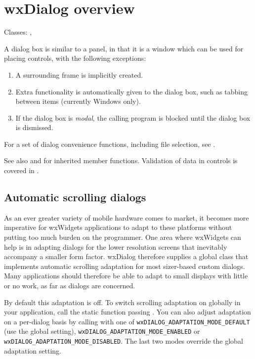 \section{wxDialog overview}\label{wxdialogoverview}

Classes: , 

A dialog box is similar to a panel, in that it is a window which can
be used for placing controls, with the following exceptions:

\begin{enumerate}
\item A surrounding frame is implicitly created.
\item Extra functionality is automatically given to the dialog box,
  such as tabbing between items (currently Windows only).
\item If the dialog box is {\it modal}, the calling program is blocked
  until the dialog box is dismissed.
\end{enumerate}

For a set of dialog convenience functions, including file selection, see
\rtfsp{}.

See also  and  for inherited
member functions. Validation of data in controls is covered in .

\subsection{Automatic scrolling dialogs}\label{autoscrollingdialogs}

As an ever greater variety of mobile hardware comes to market, it becomes more imperative for wxWidgets applications to adapt
to these platforms without putting too much burden on the programmer. One area where wxWidgets can help is in adapting
dialogs for the lower resolution screens that inevitably accompany a smaller form factor. wxDialog therefore supplies
a global  class that implements automatic scrolling adaptation for most sizer-based custom dialogs.
Many applications should therefore be able to adapt to small displays with little or no work, as far as dialogs are concerned.

By default this adaptation is off. To switch scrolling adaptation on globally in your application, call the static function\rtfsp
{} passing \true. You can also adjust adaptation on a per-dialog basis by calling\rtfsp
{} with one of {\tt wxDIALOG\_ADAPTATION\_MODE\_DEFAULT} (use the global setting), {\tt wxDIALOG\_ADAPTATION\_MODE\_ENABLED} or {\tt wxDIALOG\_ADAPTATION\_MODE\_DISABLED}.
The last two modes override the global adaptation setting.


